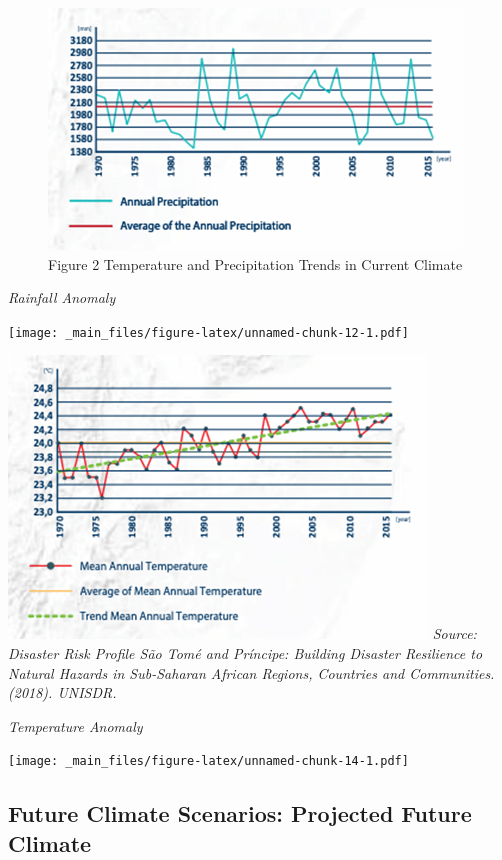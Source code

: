 \documentclass[
]{book}
\begin{document}
\begin{figure}
\centering
\includegraphics{images/pr_trends.png}
\caption{Figure 2 Temperature and Precipitation Trends in Current Climate}
\end{figure}

\emph{Rainfall Anomaly}

\texttt{[image: \_main\_files/figure-latex/unnamed-chunk-12-1.pdf]}

\includegraphics{images/temp_trends.png}
\emph{Source: Disaster Risk Profile São Tomé and Príncipe: Building Disaster Resilience to Natural Hazards in Sub-Saharan African Regions, Countries and Communities. (2018). UNISDR.}

\emph{Temperature Anomaly}

\texttt{[image: \_main\_files/figure-latex/unnamed-chunk-14-1.pdf]}

\hypertarget{future-climate-scenarios-projected-future-climate}{%
\subsection{Future Climate Scenarios: Projected Future Climate}\label{future-climate-scenarios-projected-future-climate}}
\end{document}
